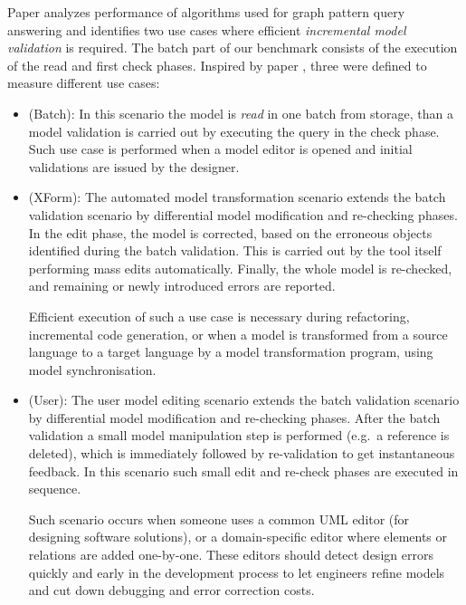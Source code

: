 Paper \cite{icgt08-bhrv} analyzes performance of algorithms used for graph
pattern query answering and identifies two use cases where efficient
\emph{incremental model validation} is required. The batch part of our benchmark
consists of the execution of the read and first check phases. Inspired by paper
\cite{icgt08-bhrv}, three  were defined to measure different
use cases:
\begin{itemize}
  
  \item {} (\textsf{Batch}):
  In this scenario the model is \emph{read} in one batch from storage, than a model validation is carried out by executing the query in the check phase. Such use case is performed when a model editor is opened and initial validations are issued by the designer. 
  
  \item {} (\textsf{XForm}):
  The automated model transformation scenario extends the batch validation scenario by differential model modification and re-checking phases. In the edit phase, the model is corrected, based on the erroneous objects identified during the batch validation. This is carried out by the tool itself performing mass edits automatically. Finally, the whole model is re-checked, and remaining or newly introduced errors are reported. 
  
  Efficient execution of such a use case is necessary during refactoring, incremental code generation, or when a model is transformed from a source language to a target language by a model transformation program, using model synchronisation.
  
  \item {} (\textsf{User}):
  The user model editing scenario extends the batch validation scenario by differential model modification and re-checking phases. After the batch validation a small model manipulation step is performed (e.g.\ a reference is deleted), which is immediately followed by re-validation to get instantaneous feedback.  In this scenario such small edit and re-check phases are executed in sequence.
  
  Such scenario occurs when someone uses a common UML editor (for designing software solutions), or a domain-specific editor where elements or relations are added one-by-one. These editors should detect design errors quickly and early in the development process to let engineers refine models and cut down debugging and error correction costs.
  
\end{itemize}


